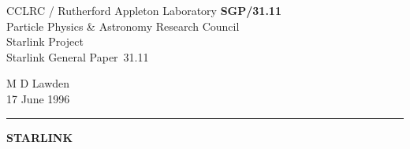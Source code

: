 \documentclass[twoside,11pt]{article}
\newcommand{\stardoccategory}  {Starlink General Paper}
\newcommand{\stardocinitials}  {SGP}
\newcommand{\stardocnumber}    {31.11}
\newcommand{\stardocauthors}   {\small M D Lawden}
\newcommand{\stardocdate}      {\small 17 June 1996}
\newcommand{\stardoctitle}     {\Large\bf STARLINK}
\newcommand{\stardocname}{\stardocinitials /\stardocnumber}
\newenvironment{latexonly}{}{}
\begin{document}
\thispagestyle{empty}

\begin{latexonly}
   {\small CCLRC / {\sc Rutherford Appleton Laboratory} \hfill {\bf \stardocname}}\\
   Particle Physics \& Astronomy Research Council\\
   Starlink Project\\
   \stardoccategory\ \stardocnumber
   \begin{flushright}
   \stardocauthors\\
   \stardocdate
   \end{flushright}
   \vspace{-4mm}
   \rule{\textwidth}{0.5mm}
   \vspace{3mm}
   \begin{center}
   {\large\bf \stardoctitle}
   \end{center}
\end{latexonly}
\end{document}
